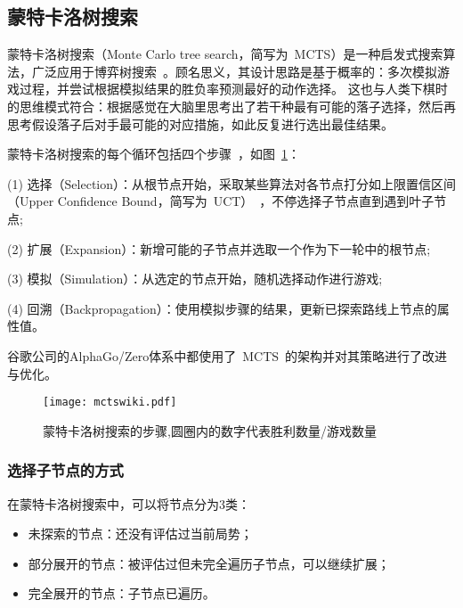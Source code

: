 \subsection{蒙特卡洛树搜索}
蒙特卡洛树搜索（Monte Carlo tree search，简写为~MCTS）是一种启发式搜索算法，广泛应用于博弈树搜索~\cite{10.1007/978-3-540-75538-8_7}。顾名思义，其设计思路是基于概率的：多次模拟游戏过程，并尝试根据模拟结果的胜负率预测最好的动作选择。
这也与人类下棋时的思维模式符合：根据感觉在大脑里思考出了若干种最有可能的落子选择，然后再思考假设落子后对手最可能的对应措施，如此反复进行选出最佳结果。

蒙特卡洛树搜索的每个循环包括四个步骤~\cite{RePEc:wsi:nmncxx:v:04:y:2008:i:03:n:s1793005708001094}，如图~\ref{fig:mcts}：

(1) 选择（Selection）：从根节点开始，采取某些算法对各节点打分如上限置信区间（Upper Confidence Bound，简写为~UCT）~\cite{10.1007/11871842_29}，不停选择子节点直到遇到叶子节点;

(2) 扩展（Expansion）：新增可能的子节点并选取一个作为下一轮中的根节点;

(3) 模拟（Simulation）：从选定的节点开始，随机选择动作进行游戏;

(4) 回溯（Backpropagation）：使用模拟步骤的结果，更新已探索路线上节点的属性值。

谷歌公司的AlphaGo/Zero体系中都使用了~MCTS~的架构并对其策略进行了改进与优化。

\begin{figure}[htb]
    \centering
    \texttt{[image: mctswiki.pdf]}
    \caption[mcts]{%
    蒙特卡洛树搜索的步骤,圆圈内的数字代表胜利数量/游戏数量~\cite{RePEc:wsi:nmncxx:v:04:y:2008:i:03:n:s1793005708001094}%
      }
    \label{fig:mcts}
\end{figure}

\subsubsection{选择子节点的方式}
在蒙特卡洛树搜索中，可以将节点分为3类：

\begin{itemize}
    \item [(1)] 
    未探索的节点：还没有评估过当前局势；
    \item [(2)]
    部分展开的节点：被评估过但未完全遍历子节点，可以继续扩展；
    \item [(3)]
    完全展开的节点：子节点已遍历。
\end{itemize}

